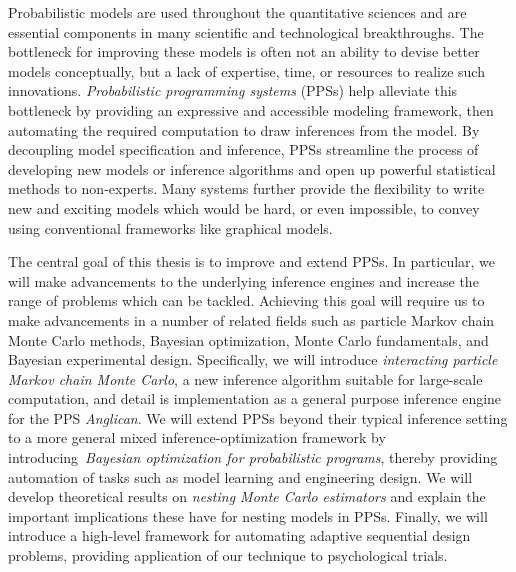 
\vspace{20pt}
Probabilistic models are used throughout the quantitative sciences and are essential components 
in many scientific and technological breakthroughs.  The bottleneck for improving these models
is often not an ability to devise better models conceptually,  but a lack of expertise,
time, or resources to realize such innovations.
\emph{Probabilistic programming systems} (PPSs) help alleviate this bottleneck 
by providing an expressive and accessible modeling framework,
 then
automating the required computation to draw inferences from the model.
By decoupling model specification and inference, PPSs 
streamline the process of developing new models or inference algorithms
and open up powerful statistical methods to non-experts.
Many systems further provide
the flexibility to write new and exciting models which would be hard, or even impossible, to convey using conventional frameworks like graphical models.

The central goal of this thesis is to improve and extend PPSs.  In particular, we will
make advancements to the underlying inference engines and increase the
range of problems which can be tackled.  Achieving this goal will require us to make
advancements in a number of related fields such as particle Markov chain Monte Carlo methods,
Bayesian optimization, Monte Carlo fundamentals, and Bayesian experimental design.
Specifically, we will introduce \emph{interacting particle
	Markov chain Monte Carlo},
a new inference algorithm suitable for large-scale computation, and 
detail is implementation as a general purpose inference engine for the PPS \emph{Anglican}. 
We will extend PPSs beyond their typical inference setting
to a more general mixed inference-optimization framework by introducing~\emph{Bayesian
	optimization for probabilistic programs}, thereby providing automation of tasks
such as model learning and engineering design.
We will develop theoretical 
results on \emph{nesting Monte Carlo
	estimators} and explain the important implications these have for nesting models in PPSs.
Finally, we will 
introduce a high-level framework for automating adaptive sequential design problems, 
providing application of our technique to psychological trials.
